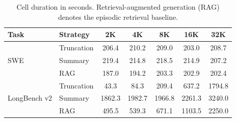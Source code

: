 \begin{table}[p]
\centering
\caption{Cell duration in seconds. Retrieval-augmented generation (RAG) denotes the episodic retrieval baseline.}
\label{tab:app_duration}
\begin{tabular}{llccccc}
\toprule
Task & Strategy & 2K & 4K & 8K & 16K & 32K \\
\midrule
\multirow{3}{*}{SWE} & Truncation & 206.4 & 210.2 & 209.0 & 203.0 & 208.7 \\
& Summary & 219.4 & 214.8 & 218.5 & 214.9 & 207.2 \\
& RAG & 187.0 & 194.2 & 203.3 & 202.9 & 202.4 \\
\midrule
\multirow{3}{*}{LongBench v2} & Truncation & 43.3 & 84.3 & 209.4 & 637.2 & 1794.8 \\
& Summary & 1862.3 & 1982.7 & 1966.8 & 2261.3 & 3240.0 \\
& RAG & 495.5 & 539.3 & 671.1 & 1103.5 & 2250.0 \\
\bottomrule
\end{tabular}
\end{table}


